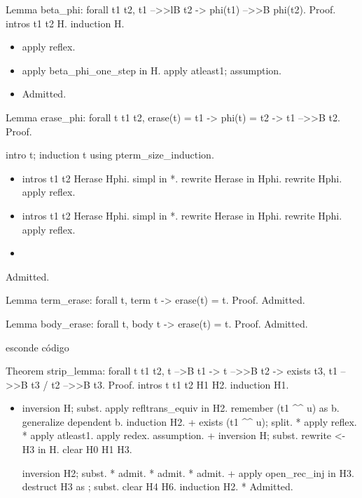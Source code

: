 Lemma beta\_phi: forall t1 t2, t1 -->>lB t2 -> phi(t1) -->>B phi(t2).
Proof.
  intros t1 t2 H.
  induction H.

\begin{itemize}
\item  apply reflex.

\item  apply beta\_phi\_one\_step in H.
    apply atleast1; assumption.

\item  Admitted.

\end{itemize}


Lemma erase\_phi: forall t t1 t2, erase(t) = t1 -> phi(t) = t2 -> t1 -->>B t2.
Proof.
  

  intro t; induction t using pterm\_size\_induction.

\begin{itemize}
\item  intros t1 t2 Herase Hphi.
    simpl in *.
    rewrite Herase in Hphi.
    rewrite Hphi.
    apply reflex.

\item  intros t1 t2 Herase Hphi.
    simpl in *.
    rewrite Herase in Hphi.
    rewrite Hphi.
    apply reflex.

\item  

\end{itemize}
  Admitted.


Lemma term\_erase: forall t, term t -> erase(t) = t.
Proof.
  Admitted.


Lemma body\_erase: forall t, body t -> erase(t) = t.
Proof.
  Admitted.


  esconde código








Theorem strip\_lemma: forall  t t1 t2, t -->B t1 -> t -->>B t2 -> exists t3, t1 -->>B t3 / t2 -->>B t3.
  Proof.
  intros t t1 t2 H1 H2.
  induction H1.

\begin{itemize}
\item  inversion H; subst.
    apply refltrans\_equiv in H2.
    remember (t1 \^{}\^{} u) as b.
    generalize  dependent b.
    induction H2.
    + exists (t1 \^{}\^{} u); split.
      * apply reflex.
      * apply atleast1.
        apply redex.
        assumption.
    + inversion H; subst.
      rewrite <- H3 in H.
      clear H0 H1 H3.


      inversion H2; subst.
      * admit.
      * admit.
      * admit.
    + 
      apply open\_rec\_inj in H3.
      destruct H3 as  ; subst.
      clear H4 H6.
      induction H2.
      * Admitted.

\end{itemize}






